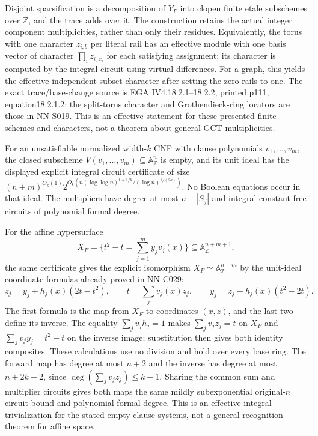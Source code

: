 Disjoint sparsification is a decomposition of $Y_F$ into clopen finite etale subschemes over $\mathbb Z$, and the trace adds over it. The construction retains the actual integer component multiplicities, rather than only their residues. Equivalently, the torus with one character $z_{i,b}$ per literal rail has an effective module with one basis vector of character $\prod_i z_{i,x_i}$ for each satisfying assignment; its character is computed by the integral circuit using virtual differences. For a graph, this yields the effective independent-subset character after setting the zero rails to one. The exact trace/base-change source is EGA IV4,18.2.1--18.2.2, printed p111, equation18.2.1.2; the split-torus character and Grothendieck-ring locators are those in NN-S019. This is an effective statement for these presented finite schemes and characters, not a theorem about general GCT multiplicities.

For an unsatisfiable normalized width-$k$ CNF with clause
polynomials $v_1,\ldots,v_m$, the closed subscheme
$V(v_1,\ldots,v_m)\subseteq\mathbb A^n_{\mathbb Z}$ is empty,
and its unit ideal has the displayed explicit integral
circuit certificate of size
$(n+m)^{O_k(1)}2^{O_k(n(\log\log n)^{1+1/k}/(\log n)^{1/(2k)})}$.
No Boolean equations occur in that ideal.  The multipliers
have degree at most $n-|S_j|$ and integral constant-free
circuits of polynomial formal degree.

For the affine hypersurface
\[
 X_F=\{t^2-t=\sum_{j=1}^m y_jv_j(x)\}
                          \subseteq\mathbb A^{n+m+1}_{\mathbb Z},
\]
the same certificate gives the explicit isomorphism
$X_F\simeq\mathbb A^{n+m}_{\mathbb Z}$ by the unit-ideal
coordinate formulas already proved in NN-C029:
\[
 z_j=y_j+h_j(x)(2t-t^2),\qquad
 t=\sum_jv_j(x)z_j,\qquad
 y_j=z_j+h_j(x)(t^2-2t).
\]
The first formula is the map from $X_F$ to coordinates
$(x,z)$, and the last two define its inverse.  The equality
$\sum_jv_jh_j=1$ makes $\sum_jv_jz_j=t$ on $X_F$ and
$\sum_jv_jy_j=t^2-t$ on the inverse image; substitution
then gives both identity composites.  These calculations
use no division and hold over every base ring.  The forward
map has degree at most $n+2$ and the inverse has degree at
most $n+2k+2$, since $\deg(\sum_jv_jz_j)\le k+1$.
Sharing the common sum and multiplier circuits gives both
maps the same mildly subexponential original-$n$ circuit
bound and polynomial formal degree.  This is an effective
integral trivialization for the stated empty clause systems,
not a general recognition theorem for affine space.




